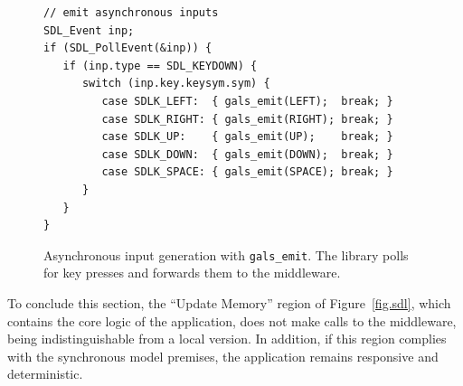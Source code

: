 \documentclass[sigplan,screen]{acmart}
\begin{document}
\begin{figure}[t]
{\scriptsize
\begin{verbatim}
// emit asynchronous inputs
SDL_Event inp;
if (SDL_PollEvent(&inp)) {
   if (inp.type == SDL_KEYDOWN) {
      switch (inp.key.keysym.sym) {
         case SDLK_LEFT:  { gals_emit(LEFT);  break; }
         case SDLK_RIGHT: { gals_emit(RIGHT); break; }
         case SDLK_UP:    { gals_emit(UP);    break; }
         case SDLK_DOWN:  { gals_emit(DOWN);  break; }
         case SDLK_SPACE: { gals_emit(SPACE); break; }
      }
   }
}
\end{verbatim}
}
  \caption{
    \label{fig.input}
    Asynchronous input generation with \texttt{gals\_emit}.
    The library polls for key presses and forwards them to the middleware.
  }
\end{figure}

To conclude this section, the ``Update Memory'' region of Figure~\ref{fig.sdl},
which contains the core logic of the application, does not make calls to the
middleware, being indistinguishable from a local version.
In addition, if this region complies with the synchronous model premises, the
application remains responsive and deterministic.

\end{document}
